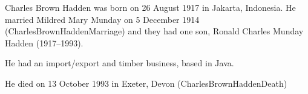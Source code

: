 
Charles Brown Hadden was born on 26 August 1917 in Jakarta, Indonesia.  He married Mildred Mary Munday on 5 December 1914 (CharlesBrownHaddenMarriage) and they had one son, Ronald Charles Munday Hadden (1917--1993). 

He had an import/export and timber business, based in Java.

He died on 13 October 1993 in Exeter, Devon (CharlesBrownHaddenDeath)
